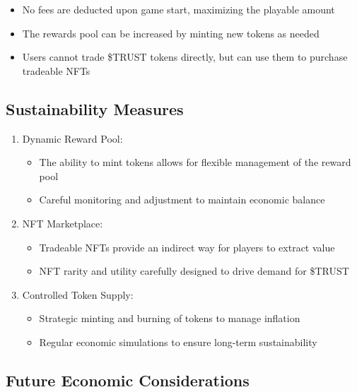 \documentclass[]{article}
\begin{document}
\begin{itemize}
\item No fees are deducted upon game start, maximizing the playable amount
\item The rewards pool can be increased by minting new tokens as needed
\item Users cannot trade \$TRUST tokens directly, but can use them to purchase tradeable NFTs
\end{itemize}

\subsection{Sustainability Measures}

\begin{enumerate}
\item Dynamic Reward Pool:
   \begin{itemize}
   \item The ability to mint tokens allows for flexible management of the reward pool
   \item Careful monitoring and adjustment to maintain economic balance
   \end{itemize}
\item NFT Marketplace:
   \begin{itemize}
   \item Tradeable NFTs provide an indirect way for players to extract value
   \item NFT rarity and utility carefully designed to drive demand for \$TRUST
   \end{itemize}
\item Controlled Token Supply:
   \begin{itemize}
   \item Strategic minting and burning of tokens to manage inflation
   \item Regular economic simulations to ensure long-term sustainability
   \end{itemize}
\end{enumerate}

\subsection{Future Economic Considerations}
\end{document}
